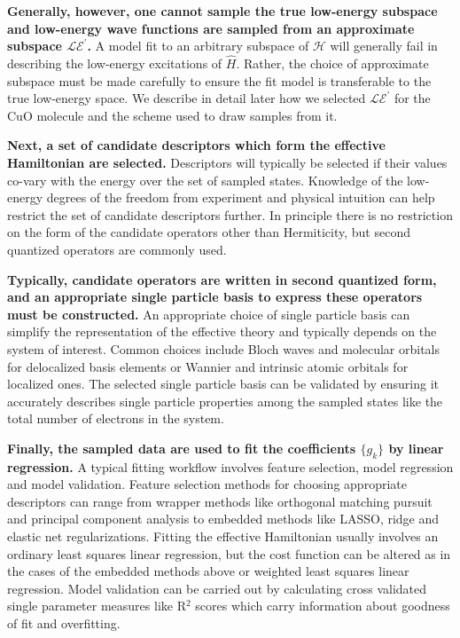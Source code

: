 \documentclass[12pt]{article}
\begin{document}
\textbf{Generally, however, one cannot sample the true low-energy subspace and low-energy wave functions are sampled from an approximate subspace $\mathcal{LE}^\prime$.}
A model fit to an arbitrary subspace of $\mathcal{H}$ will generally fail in describing the low-energy excitations of $\hat{H}$.
Rather, the choice of approximate subspace must be made carefully to ensure the fit model is transferable to the true low-energy space.
We describe in detail later how we selected $\mathcal{LE}^\prime$ for the CuO molecule and the scheme used to draw samples from it.

\textbf{Next, a set of candidate descriptors which form the effective Hamiltonian are selected.}
Descriptors will typically be selected if their values co-vary with the energy over the set of sampled states. 
Knowledge of the low-energy degrees of the freedom from experiment and physical intuition can help restrict the set of candidate descriptors further.
In principle there is no restriction on the form of the candidate operators other than Hermiticity, but second quantized operators are commonly used.

\textbf{Typically, candidate operators are written in second quantized form, and an appropriate single particle basis to express these operators must be constructed.}
An appropriate choice of single particle basis can simplify the representation of the effective theory and typically depends on the system of interest.
Common choices include Bloch waves and molecular orbitals for delocalized basis elements or Wannier and intrinsic atomic orbitals for localized ones.
The selected single particle basis can be validated by ensuring it accurately describes single particle properties among the sampled states like the total number of electrons in the system.

\textbf{ Finally, the sampled data are used to fit the coefficients $\{g_k\}$ by linear regression.}
A typical fitting workflow involves feature selection, model regression and model validation.
Feature selection methods for choosing appropriate descriptors can range from wrapper methods like orthogonal matching pursuit and principal component analysis to embedded methods like LASSO, ridge and elastic net regularizations. 
Fitting the effective Hamiltonian usually involves an ordinary least squares linear regression, but the cost function can be altered as in the cases of the embedded methods above or weighted least squares linear regression.
Model validation can be carried out by calculating cross validated single parameter measures like R$^2$ scores which carry information about goodness of fit and overfitting.
\end{document}
